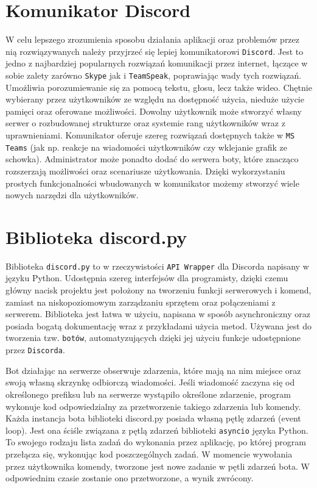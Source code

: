 \documentclass[shortabstract,inz]{iithesis}
\begin{document}
		\section{Komunikator Discord}
			W celu lepszego zrozumienia sposobu działania aplikacji oraz problemów przez nią rozwiązywanych należy przyjrzeć się lepiej komunikatorowi \texttt{Discord}. Jest to jedno z najbardziej popularnych rozwiązań komunikacji przez internet, łączące w sobie zalety zarówno \texttt{Skype}\cite{skype} jak i \texttt{TeamSpeak}\cite{teamspeak}, poprawiając wady tych rozwiązań. Umożliwia porozumiewanie się za pomocą tekstu, głosu, lecz także wideo. Chętnie wybierany przez użytkowników ze względu na dostępność użycia, nieduże użycie pamięci oraz oferowane możliwości. Dowolny użytkownik może stworzyć własny serwer o rozbudowanej strukturze oraz systemie rang użytkowników wraz z uprawnieniami. Komunikator oferuje szereg rozwiązań dostępnych także w \texttt{MS Teams}\cite{msteams} (jak np. reakcje na wiadomości użytkowników czy wklejanie grafik ze schowka). Administrator może ponadto dodać do serwera boty, które znacząco rozszerzają możliwości oraz scenariusze użytkowania. Dzięki wykorzystaniu prostych funkcjonalności wbudowanych w komunikator możemy stworzyć wiele nowych narzędzi dla użytkowników.
		
		\section{Biblioteka discord.py}
			Biblioteka \texttt{discord.py} to w rzeczywistości \texttt{API Wrapper} dla Discorda napisany w języku Python. Udostępnia szereg interfejsów dla programisty, dzięki czemu główny nacisk projektu jest położony na tworzeniu funkcji serwerowych i komend, zamiast na niskopoziomowym zarządzaniu sprzętem oraz połączeniami z serwerem. Biblioteka jest łatwa w użyciu, napisana w sposób asynchroniczny oraz posiada bogatą dokumentację\cite{discordpydocs} wraz z przykładami użycia metod\cite{discordpyexamples}. Używana jest do tworzenia tzw. \texttt{botów}, automatyzujących dzięki jej użyciu funkcje udostępnione przez \texttt{Discorda}. 

			Bot działając na serwerze obserwuje zdarzenia, które mają na nim miejsce oraz swoją własną skrzynkę odbiorczą wiadomości. Jeśli wiadomość zaczyna się od określonego prefiksu lub na serwerze wystąpiło określone zdarzenie, program wykonuje kod odpowiedzialny za przetworzenie takiego zdarzenia lub komendy. 
			Każda instancja bota biblioteki discord.py posiada własną pętlę zdarzeń (event loop). Jest ona ściśle związana z pętlą zdarzeń biblioteki \texttt{asyncio} języka Python. To swojego rodzaju lista zadań do wykonania przez aplikację, po której program przełącza się, wykonując kod poszczególnych zadań. W momencie wywołania przez użytkownika komendy, tworzone jest nowe zadanie w pętli zdarzeń bota. W odpowiednim czasie zostanie ono przetworzone, a wynik zwrócony.
			
\end{document}
